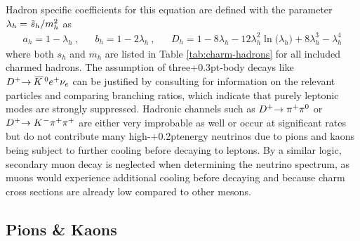 Hadron specific coefficients for this equation are defined with the parameter
$\lambda_h = \kern+0.5pt \tilde{s}_h / m_h^2 \kern+0.2pt$ as
\begin{align*}
	a_h = 1 - \lambda_h \: , && b_h = 1 - 2\lambda_h \: , &&
	D_h = 1 - 8 \lambda_h - 12\lambda_h^2 \ln \bigl( \lambda_h \bigr) + 8 \lambda_h^3 - \lambda_h^4
\end{align*}
where both $s_h$ and $m_h$ are listed in Table \ref{tab:charm-hadrons} for all included charmed hadrons. The assumption of
three{\kern+0.3pt}-body decays like $D^+ \kern-2.5pt \rightarrow \kern+1.0pt \overline{\kern-1.5pt K \kern+1.0pt}\kern+1.0pt^0 e^+ \nu_e$
can be justified by consulting \cite{pdg} for information on the relevant particles and comparing branching ratios, which indicate
that purely leptonic modes are strongly suppressed. Hadronic channels such as $D^+ \kern-2.5pt \rightarrow \pi^+ \pi^0$ or
$D^+ \kern-2.5pt \rightarrow K^{\kern+0.5pt -} \pi^+ \pi^+$ are either very improbable as well or occur at significant rates but
do not contribute many high-{\kern+0.2pt}energy neutrinos due to pions and kaons being subject to further cooling before decaying
to leptons. By a similar logic, secondary muon decay is neglected when determining the neutrino spectrum, as muons would experience
additional cooling before decaying and because charm cross sections are already low compared to other mesons.

\newpage





\subsection{Pions \& Kaons}
\label{sub:pions}

